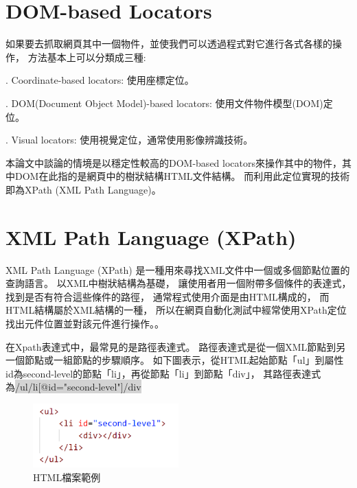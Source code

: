 \section{DOM-based Locators}\label{s2.3}
如果要去抓取網頁其中一個物件，並使我們可以透過程式對它進行各式各樣的操作，
方法基本上可以分類成三種\cite{Web-Locators}:

. Coordinate-based locators: 使用座標定位。

. DOM(Document Object Model)-based locators: 使用文件物件模型(DOM)定位。

. Visual locators: 使用視覺定位，通常使用影像辨識技術。

\indent
本論文中談論的情境是以穩定性較高的DOM-based locators來操作其中的物件，其中DOM在此指的是網頁中的樹狀結構HTML文件結構。
而利用此定位實現的技術即為XPath (XML Path Language)\cite{Xpath}。

\section{XML Path Language (XPath)}\label{s2.4}
XML Path Language (XPath) 是一種用來尋找XML文件中一個或多個節點位置的查詢語言。
以XML中樹狀結構為基礎，
讓使用者用一個附帶多個條件的表達式，
找到是否有符合這些條件的路徑，
通常程式使用介面是由HTML構成的，
而HTML結構屬於XML結構的一種，
所以在網頁自動化測試中經常使用XPath定位找出元件位置\cite{Test-Case-Aging-By-Xpath}並對該元件進行操作。。


在Xpath表達式中，最常見的是路徑表達式\cite{Xpath-Selenium-Selectors}。
路徑表達式是從一個XML節點到另一個節點或一組節點的步驟順序。
如下圖表示，從HTML起始節點「ul」到屬性id為second-level的節點「li」，再從節點「li」到節點「div」，
其路徑表達式為\colorbox{lightgray}{/ul/li[@id="second-level"]/div}                                                                                                                                                                                                                                                   

\begin{figure}[H]
    \centering
    \includegraphics[width=0.5\textwidth]{picture/ch2-xpathExample.png}
    \caption{HTML檔案範例}
    \label{f2.2}
\end{figure}

